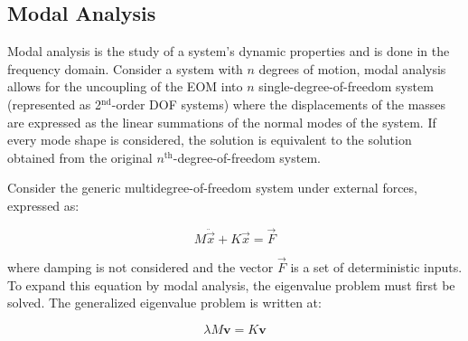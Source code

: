 \documentclass[12pt,letter]{article}
\begin{document}
	
	
	
	\subsection{Modal Analysis}
	
	
	
	Modal analysis is the study of a system's dynamic properties and is done in the frequency domain. Consider a system with $n$ degrees of motion, modal analysis allows for the uncoupling of the EOM into $n$ single-degree-of-freedom system (represented as 2$^{\text{nd}}$-order DOF systems) where the displacements of the masses are expressed as the linear summations of the normal modes of the system. If every mode shape is considered, the solution is equivalent to the solution obtained from the original $n^{\text{th}}$-degree-of-freedom system. 
	
	Consider the generic multidegree-of-freedom system under external forces, expressed as:
	
	
	\begin{equation}
	M \ddot{\vec{x}} + K\vec{x} = \vec{F}
	\end{equation}
	
	
	\noindent where damping is not considered and the vector $\vec{F}$ is a set of deterministic inputs. To expand this equation by modal analysis, the eigenvalue problem must first be solved. The generalized eigenvalue problem is written at: 
	
	\begin{equation}
	\lambda M \textbf{v} = K \textbf{v}
	\label{eq:generiq_MDOF_system}
	\end{equation}
	
\end{document}
